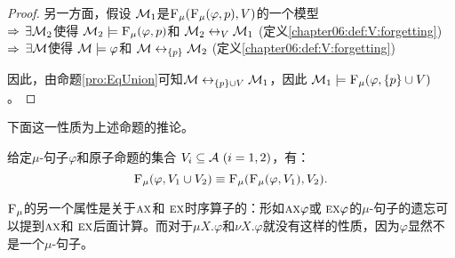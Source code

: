 \begin{proof}
	另一方面，假设 ${\cal M}_1$是${\textsc{F}_{\textsc{$\mu$}}}({\textsc{F}_{\textsc{$\mu$}}}(\varphi, p), V)$的一个模型 \\
	$\Rightarrow$ $\exists {\cal M}_2$使得 ${\cal M}_2 \models  {\textsc{F}_{\textsc{$\mu$}}}(\varphi, p)$和 ${\cal M}_2 \leftrightarrow_V {\cal M}_1$ \hfill(定义\ref{chapter06:def:V:forgetting})\\
	$\Rightarrow$ $\exists {\cal M}$使得 ${\cal M} \models \varphi$和 ${\cal M} \leftrightarrow_{\{p\}} {\cal M}_2$ \hfill(定义\ref{chapter06:def:V:forgetting})
	
	因此，由命题\ref{pro:EqUnion}可知${\cal M} \leftrightarrow_{\{p\} \cup V} {\cal M}_1$，因此 ${\cal M}_1 \models {\textsc{F}_{\textsc{$\mu$}}}(\varphi, \{p\} \cup V)$。
\end{proof}


下面这一性质为上述命题的推论。

\begin{corollary}[切片性]\label{chapter06:disTFV}
	给定$\mu$-句子$\varphi$和原子命题的集合 $V_i\subseteq{\cal A}~(i=1,2)$，有：
	\[
	{\textsc{F}_{\textsc{$\mu$}}}(\varphi, V_1 \cup V_2) \equiv {\textsc{F}_{\textsc{$\mu$}}}({\textsc{F}_{\textsc{$\mu$}}}(\varphi, V_1), V_2).
	\]
\end{corollary}

${\textsc{F}_{\textsc{$\mu$}}}$的另一个属性是关于$\textsc{a}\textsc{x}$和 $\textsc{e} \textsc{x}$时序算子的：形如$\textsc{a}\textsc{x} \varphi$或 $\textsc{e} \textsc{x} \varphi$的$\mu$-句子的遗忘可以提到$\textsc{a}\textsc{x}$和 $\textsc{e} \textsc{x}$后面计算。而对于$\mu X. \varphi$和$\nu X. \varphi$就没有这样的性质，因为$\varphi$显然不是一个$\mu$-句子。


